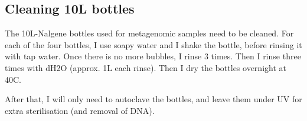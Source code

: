 \subsection{Cleaning 10L bottles}
\label{task:20180308_cj1}

The 10L-Nalgene bottles used for metagenomic samples need to be cleaned. For each of the four bottles, I use soapy water and I shake the bottle, before rinsing it with tap water. Once there is no more bubbles, I rinse 3 times. Then I rinse three times with dH2O (approx. 1L each rinse). Then I dry the bottles overnight at 40\degree C.

After that, I will only need to autoclave the bottles, and leave them under UV for extra sterilisation (and removal of DNA).